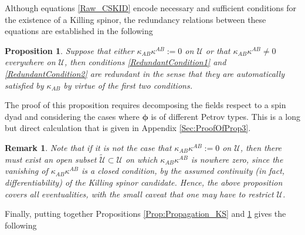 \documentclass[10pt,a4paper]{article}
\theoremstyle{plain}
\newtheorem{proposition}{Proposition}
\newtheorem{remark}{Remark}
\begin{document}
Although equations \eqref{Raw_CSKID} encode
necessary and sufficient conditions for the existence of a
Killing spinor, the redundancy relations between these equations are established
in the following
\begin{proposition}\label{prop_remove_redundant_conditions}
Suppose that either $\kappa_{AB}\kappa^{AB}:= 0$ on $\mathcal{U}$ or
that $\kappa_{AB}\kappa^{AB}\neq 0$ everywhere on $\mathcal{U}$, then
conditions \eqref{RedundantCondition1} and \eqref{RedundantCondition2}
are redundant in the sense that they are automatically satisfied by
$\kappa_{AB}$ by virtue of the first two conditions.
\end{proposition}

The proof of this proposition requires decomposing the fields respect to a spin dyad
and considering the cases where $\bm\phi$ is of different Petrov types.
This is a long but direct calculation that is given in Appendix \ref{Sec:ProofOfProp3}.


\begin{remark}{\em 
Note that if it is not the case that $\kappa_{AB}\kappa^{AB}:= 0$ on
$\mathcal{U}$, then there must exist an open subset
$\tilde{\mathcal{U}}\subset\mathcal{U}$ on which
$\kappa_{AB}\kappa^{AB}$ is nowhere zero, since the vanishing of
$\kappa_{AB}\kappa^{AB}$ is a closed condition, by the assumed
continuity (in fact, differentiability) of the Killing spinor
candidate. Hence, the above proposition covers all eventualities, with
the small caveat that one may have to restrict $\mathcal{U}$.  }
\end{remark}

\noindent
Finally, putting together Propositions
\ref{Prop:Propagation_KS} and \ref{prop_remove_redundant_conditions}
gives the following
\end{document}
